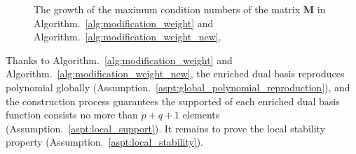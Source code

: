 \begin{figure}[ht]
	\center
	\caption{The growth of the maximum condition numbers of the matrix $\mathbf{M}$ in Algorithm.~\ref{alg:modification_weight} and Algorithm.~\ref{alg:modification_weight_new}.}
	\label{fig:condition_number}
\end{figure}

Thanks to Algorithm.~\ref{alg:modification_weight} and Algorithm.~\ref{alg:modification_weight_new}, the enriched dual basis reproduces polynomial globally (Assumption.~\ref{aspt:global_polynomial_reproduction}), and the construction process guarantees the supported of each enriched dual basis function consists no more than $p+q+1$ elements (Assumption.~\ref{aspt:local_support}). It remains to prove the local stability property (Assumption.~\ref{aspt:local_stability}).

